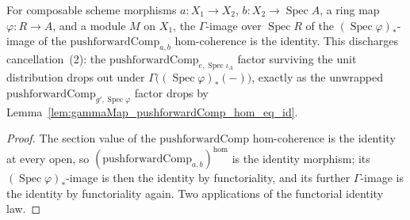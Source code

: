 \begin{lemma}

  \label{lem:base_change_mate_inner_eCancel_pushforwardComp}
  For composable scheme morphisms \(a : X_1 \to X_2\), \(b : X_2 \to \operatorname{Spec} A\), a ring
  map \(\varphi : R \to A\), and a module \(M\) on \(X_1\), the \(\Gamma\)-image over
  \(\operatorname{Spec} R\) of the \((\operatorname{Spec}\varphi)_{*}\)-image of the
  \(\mathrm{pushforwardComp}_{a,b}\) hom-coherence is the identity. This discharges
  cancellation~(2): the \(\mathrm{pushforwardComp}_{e,\operatorname{Spec}\iota_A}\) factor surviving
  the unit distribution drops out under \(\Gamma\bigl((\operatorname{Spec}\varphi)_{*}(-)\bigr)\),
  exactly as the unwrapped \(\mathrm{pushforwardComp}_{g',\operatorname{Spec}\varphi}\) factor drops
  by Lemma~\ref{lem:gammaMap_pushforwardComp_hom_eq_id}.
\end{lemma}
\begin{proof}
  The section value of the \(\mathrm{pushforwardComp}\) hom-coherence is the identity at every open,
  so \((\mathrm{pushforwardComp}_{a,b})^{\mathrm{hom}}\) is the identity morphism; its
  \((\operatorname{Spec}\varphi)_{*}\)-image is then the identity by functoriality, and its further
  \(\Gamma\)-image is the identity by functoriality again. Two applications of the functorial
  identity law.
\end{proof}


